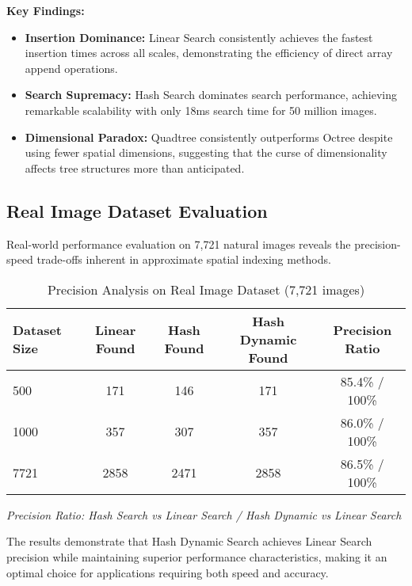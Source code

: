 \documentclass{sbc2023}
\begin{document}
\textbf{Key Findings:}

\begin{itemize}
    \item \textbf{Insertion Dominance:} Linear Search consistently achieves the fastest insertion times across all scales, demonstrating the efficiency of direct array append operations.
    \item \textbf{Search Supremacy:} Hash Search dominates search performance, achieving remarkable scalability with only 18ms search time for 50 million images.
    \item \textbf{Dimensional Paradox:} Quadtree consistently outperforms Octree despite using fewer spatial dimensions, suggesting that the curse of dimensionality affects tree structures more than anticipated.
\end{itemize}

\subsection{Real Image Dataset Evaluation}

Real-world performance evaluation on 7,721 natural images reveals the precision-speed trade-offs inherent in approximate spatial indexing methods.

\begin{table}[H]
    \footnotesize 
    \centering
    \caption{Precision Analysis on Real Image Dataset (7,721 images)}
    \label{tab:precision_analysis}
    \setlength{\tabcolsep}{3pt}
    \begin{tabularx}{\columnwidth}{|l|c|c|c|c|}
        \hline
        \textbf{Dataset Size} & \textbf{Linear Found} & \textbf{Hash Found} & \textbf{Hash Dynamic Found} & \textbf{Precision Ratio} \\
        \hline
        500 & 171 & 146 & 171 & 85.4\% / 100\% \\
        1000 & 357 & 307 & 357 & 86.0\% / 100\% \\
        7721 & 2858 & 2471 & 2858 & 86.5\% / 100\% \\
        \hline
    \end{tabularx}
    \vspace{0.2cm}
    \begin{minipage}{\columnwidth}
    \footnotesize
    \textit{Precision Ratio: Hash Search vs Linear Search / Hash Dynamic vs Linear Search}
    \end{minipage}
\end{table}

The results demonstrate that Hash Dynamic Search achieves Linear Search precision while maintaining superior performance characteristics, making it an optimal choice for applications requiring both speed and accuracy.
\end{document}

